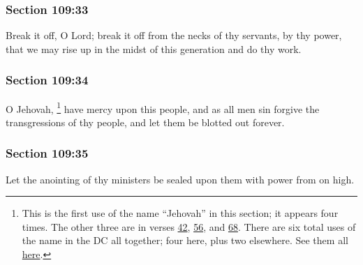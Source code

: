 	\subsubsection{Section 109:33} %
		\label{DC109-33}

		Break it off, O Lord; break it off from the necks of thy servants, by thy power, that we may rise up in the midst of this generation and do thy work.


	\subsubsection{Section 109:34} %
		\label{DC109-34}

		O Jehovah,%
			\footnote{%
				This is the first use of the name ``Jehovah'' in this section; it appears four times. The other three are in verses \hyperref[DC109-42]{42}, \hyperref[DC109-56]{56}, and \hyperref[DC109-68]{68}. There are six total uses of the name in the DC all together; four here, plus two elsewhere. See them all \hyperref[JEHOVAH-DC]{here}.
				}
		have mercy upon this people, and as all men sin forgive the transgressions of thy people, and let them be blotted out forever.


	\subsubsection{Section 109:35} %
		\label{DC109-35}

		Let the anointing of thy ministers be sealed upon them with power from on high.

